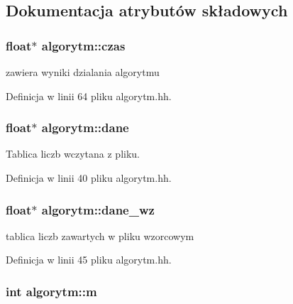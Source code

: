 \subsection{\-Dokumentacja atrybutów składowych}
\hypertarget{classalgorytm_a8005d5f3266848b756400e3bb189de58}{
\subsubsection[{czas}]{\setlength{\rightskip}{0pt plus 5cm}float$\ast$ {\bf algorytm\-::czas}}}\label{classalgorytm_a8005d5f3266848b756400e3bb189de58}


zawiera wyniki dzialania algorytmu 



\-Definicja w linii 64 pliku algorytm.\-hh.

\hypertarget{classalgorytm_a5dd6d510b611002cfb9737f12eeff63f}{
\subsubsection[{dane}]{\setlength{\rightskip}{0pt plus 5cm}float$\ast$ {\bf algorytm\-::dane}}}\label{classalgorytm_a5dd6d510b611002cfb9737f12eeff63f}


\-Tablica liczb wczytana z pliku. 



\-Definicja w linii 40 pliku algorytm.\-hh.

\hypertarget{classalgorytm_a93fb0f7a64eb1e4f8492445395f98e5f}{
\subsubsection[{dane\-\_\-wz}]{\setlength{\rightskip}{0pt plus 5cm}float$\ast$ {\bf algorytm\-::dane\-\_\-wz}}}\label{classalgorytm_a93fb0f7a64eb1e4f8492445395f98e5f}


tablica liczb zawartych w pliku wzorcowym 



\-Definicja w linii 45 pliku algorytm.\-hh.

\hypertarget{classalgorytm_ac9429e88b0630a008df4d011458ee5a2}{
\subsubsection[{m}]{\setlength{\rightskip}{0pt plus 5cm}int {\bf algorytm\-::m}}}\label{classalgorytm_ac9429e88b0630a008df4d011458ee5a2}


